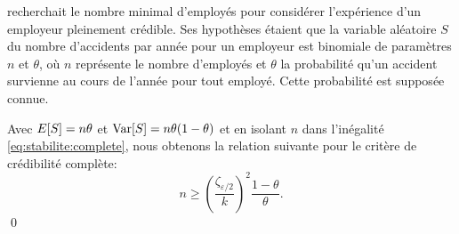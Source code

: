 \begin{exemple}
  \label{exemple:stabilite:binomiale_pure}
  \citet{Mowbray:1914} recherchait le nombre minimal d'employés pour
  considérer l'expérience d'un employeur pleinement crédible. Ses
  hypothèses étaient que la variable aléatoire $S$ du nombre
  d'accidents par année pour un employeur est binomiale de paramètres
  $n$ et $\theta$, où $n$ représente le nombre d'employés et $\theta$
  la probabilité qu'un accident survienne au cours de l'année pour
  tout employé. Cette probabilité est supposée connue.

  Avec $E [ S ] = n \theta$ et $\operatorname{Var} [ S ] = n \theta (1 - \theta)$ et en
  isolant $n$ dans l'inégalité \eqref{eq:stabilite:complete}, nous
  obtenons la relation suivante pour le critère de crédibilité
  complète:
  \begin{displaymath}
    n \geq
    \left(
      \frac{\zeta_{\varepsilon/2}}{k}
    \right)^2
    \frac{1 - \theta}{\theta}.
  \end{displaymath}
  \qed
\end{exemple}

